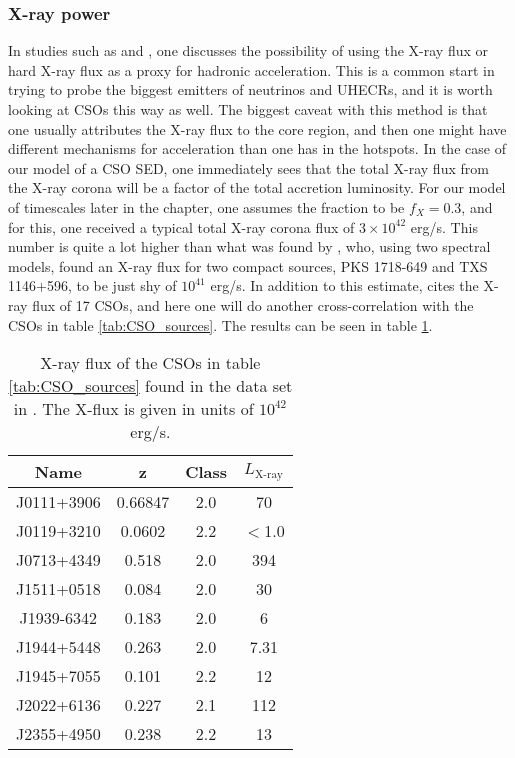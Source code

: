 \subsubsection{X-ray power}
In studies such as \cite{Jacobsen:2015mga} and \cite{10.1111/j.1745-3933.2008.00499.x}, one discusses the possibility of using the X-ray flux or hard X-ray flux as a proxy for hadronic acceleration. This is a common start in trying to probe the biggest emitters of neutrinos and UHECRs, and it is worth looking at CSOs this way as well. The biggest caveat with this method is that one usually attributes the X-ray flux to the core region, and then one might have different mechanisms for acceleration than one has in the hotspots. In the case of our model of a CSO SED, one immediately sees that the total X-ray flux from the X-ray corona will be a factor of the total accretion luminosity. For our model of timescales later in the chapter, one assumes the fraction to be $f_X = 0.3$, and for this, one received a typical total X-ray corona flux of $3 \times 10^{42}$ erg/s. This number is quite a lot higher than what was found by \cite{bronzini2024investigating}, who, using two spectral models, found an X-ray flux for two compact sources, PKS 1718-649 and TXS 1146+596, to be just shy of $10^{41}$ erg/s. In addition to this estimate, \cite{W_jtowicz_2020} cites the X-ray flux of 17 CSOs, and here one will do another cross-correlation with the CSOs in table \ref*{tab:CSO_sources}. The results can be seen in table \ref{tab:CSO_xray}.


\begin{table}
    \centering
    \begin{tabular}{|c|c|c|c|}
        \hline
        \textbf{Name} & \textbf{z} & \textbf{Class} &   \textbf{$L_{\text{X-ray}}$} \\
        \hline

        

        J0111+3906 & 0.66847 & 2.0 & 70 \\
        J0119+3210 & 0.0602 & 2.2 & $<$1.0 \\
        J0713+4349 & 0.518 & 2.0 & 394 \\
        J1511+0518 & 0.084 & 2.0 & 30 \\
        J1939-6342 & 0.183 & 2.0 & 6 \\
        J1944+5448 & 0.263 & 2.0 & 7.31 \\
        J1945+7055 & 0.101 & 2.2 & 12 \\ 
        J2022+6136& 0.227 & 2.1 & 112 \\
        J2355+4950 & 0.238 & 2.2 & 13 \\
        \hline
    \end{tabular}
    \caption{X-ray flux of the CSOs in table \ref{tab:CSO_sources} found in the data set in \cite{W_jtowicz_2020}. The X-flux is given in units of $10^{42}$ erg/s.}
\label{tab:CSO_xray}
\end{table}

